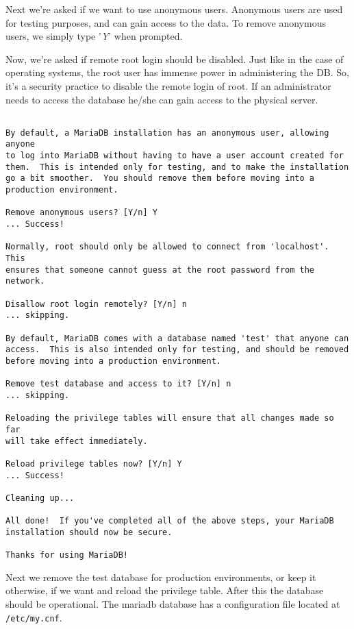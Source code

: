 Next we're asked if we want to use anonymous users. Anonymous users are used for testing purposes, and can gain access to the data. To remove anonymous users, we simply type '\textit{Y}' when prompted. 

Now, we're asked if remote root login should be disabled. Just like in the case of operating systems, the root user has immense power in administering the DB. So, it's a security practice to disable the remote login of root. If an administrator needs to access the database he/she can gain access to the physical server. 

\vspace{-15pt}
\begin{verbatim}

By default, a MariaDB installation has an anonymous user, allowing anyone
to log into MariaDB without having to have a user account created for
them.  This is intended only for testing, and to make the installation
go a bit smoother.  You should remove them before moving into a
production environment.

Remove anonymous users? [Y/n] Y
... Success!

Normally, root should only be allowed to connect from 'localhost'.  This
ensures that someone cannot guess at the root password from the network.

Disallow root login remotely? [Y/n] n
... skipping.

By default, MariaDB comes with a database named 'test' that anyone can
access.  This is also intended only for testing, and should be removed
before moving into a production environment.

Remove test database and access to it? [Y/n] n
... skipping.

Reloading the privilege tables will ensure that all changes made so far
will take effect immediately.

Reload privilege tables now? [Y/n] Y
... Success!

Cleaning up...

All done!  If you've completed all of the above steps, your MariaDB
installation should now be secure.

Thanks for using MariaDB!
\end{verbatim}
\vspace{-10pt}	

\noindent
Next we remove the test database for production environments, or keep it otherwise, if we want and reload the privilege table. After this the database should be operational. The mariadb database has a configuration file located at \verb|/etc/my.cnf|. 

